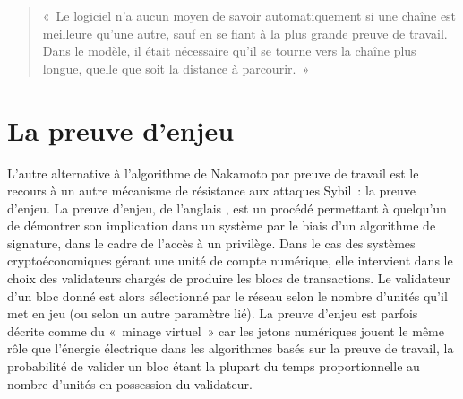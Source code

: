 \begin{quote}
«~Le logiciel n'a aucun moyen de savoir automatiquement si une chaîne est meilleure qu'une autre, sauf en se fiant à la plus grande preuve de travail. Dans le modèle, il était nécessaire qu'il se tourne vers la chaîne plus longue, quelle que soit la distance à parcourir.~»
\end{quote} %

\vspace{-1em}
\section*{La preuve d'enjeu}

L'autre alternative à l'algorithme de Nakamoto par preuve de travail est le recours à un autre mécanisme de résistance aux attaques Sybil~: la preuve d'enjeu. La preuve d'enjeu, de l'anglais , est un procédé permettant à quelqu'un de démontrer son implication dans un système par le biais d'un algorithme de signature, dans le cadre de l'accès à un privilège. Dans le cas des systèmes cryptoéconomiques gérant une unité de compte numérique, elle intervient dans le choix des validateurs chargés de produire les blocs de transactions. Le validateur d'un bloc donné est alors sélectionné par le réseau selon le nombre d'unités qu'il met en jeu (ou selon un autre paramètre lié). La preuve d'enjeu est parfois décrite comme du «~minage virtuel~» car les jetons numériques jouent le même rôle que l'énergie électrique dans les algorithmes basés sur la preuve de travail, la probabilité de valider un bloc étant la plupart du temps proportionnelle au nombre d'unités en possession du validateur.

